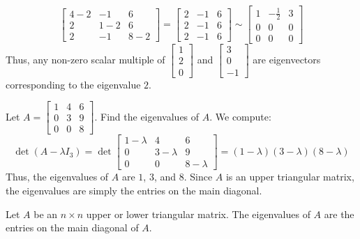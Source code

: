 \begin{eg}
\[\begin{bmatrix}
        4 - 2 & -1 & 6 \\
        2 & 1 - 2 & 6 \\
        2 & -1 & 8 - 2
    \end{bmatrix} = \begin{bmatrix}
        2 & -1 & 6 \\
        2 & -1 & 6 \\
        2 & -1 & 6
    \end{bmatrix} \sim \begin{bmatrix}
        1 & -\frac{1}{2} & 3 \\
        0 & 0 & 0 \\
        0 & 0 & 0
    \end{bmatrix}\]
    Thus, any non-zero scalar multiple of $\begin{bmatrix}
        1 \\ 2 \\ 0
    \end{bmatrix}$ and $\begin{bmatrix}
        3 \\ 0 \\ -1
    \end{bmatrix}$ are eigenvectors corresponding to the eigenvalue $2$.
\end{eg}

\begin{eg}
    Let $A = \begin{bmatrix}
        1 & 4 & 6 \\ 0 & 3 & 9 \\ 0 & 0 & 8
    \end{bmatrix}$. Find the eigenvalues of $A$. We compute:
    \[\det(A - \lambda I_3) = \det\begin{bmatrix}
        1 - \lambda & 4 & 6 \\ 0 & 3 - \lambda & 9 \\ 0 & 0 & 8 - \lambda
    \end{bmatrix} = (1 - \lambda)(3 - \lambda)(8 - \lambda)\]
    Thus, the eigenvalues of $A$ are $1$, $3$, and $8$. Since $A$ is an upper triangular matrix, the eigenvalues are simply the entries on the main diagonal.
\end{eg}

\begin{theorem}
    Let $A$ be an $n \times n$ upper or lower triangular matrix. The eigenvalues of $A$ are the entries on the main diagonal of $A$.
\end{theorem}

